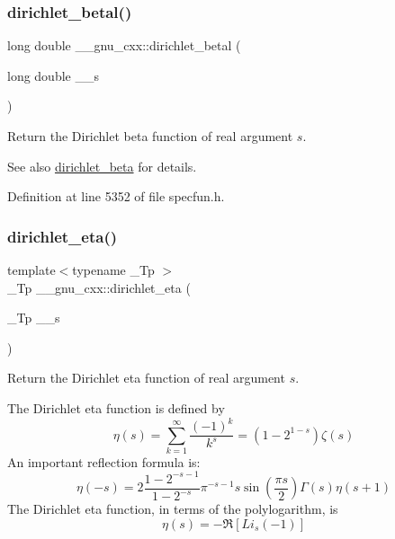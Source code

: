 \subsubsection{\texorpdfstring{dirichlet\+\_\+betal()}{dirichlet\_betal()}}
{\footnotesize\ttfamily long double \+\_\+\+\_\+gnu\+\_\+cxx\+::dirichlet\+\_\+betal (\begin{DoxyParamCaption}\item[{long double}]{\+\_\+\+\_\+s }\end{DoxyParamCaption})\hspace{0.3cm}{\ttfamily [inline]}}

Return the Dirichlet beta function of real argument $ s $.

\begin{DoxySeeAlso}{See also}
\hyperlink{group__gnu__math__spec__func_ga87466a2d429a2815d794acc21c882b08}{dirichlet\+\_\+beta} for details. 
\end{DoxySeeAlso}


Definition at line 5352 of file specfun.\+h.

\mbox{\label{group__gnu__math__spec__func_gae46e26e4107675d285c79a2d6202e6c7}} 
\subsubsection{\texorpdfstring{dirichlet\+\_\+eta()}{dirichlet\_eta()}}
{\footnotesize\ttfamily template$<$typename \+\_\+\+Tp $>$ \\
\+\_\+\+Tp \+\_\+\+\_\+gnu\+\_\+cxx\+::dirichlet\+\_\+eta (\begin{DoxyParamCaption}\item[{\+\_\+\+Tp}]{\+\_\+\+\_\+s }\end{DoxyParamCaption})\hspace{0.3cm}{\ttfamily [inline]}}

Return the Dirichlet eta function of real argument $ s $.

The Dirichlet eta function is defined by \[ \eta(s) = \sum_{k=1}^\infty \frac{(-1)^k}{k^s} = \left( 1 - 2^{1-s} \right) \zeta(s) \] An important reflection formula is\+: \[ \eta(-s) = 2 \frac{1-2^{-s-1}}{1-2^{-s}} \pi^{-s-1} s \sin(\frac{\pi s}{2}) \Gamma(s) \eta(s+1) \] The Dirichlet eta function, in terms of the polylogarithm, is \[ \eta(s) = -\Re[Li_s(-1)] \]


